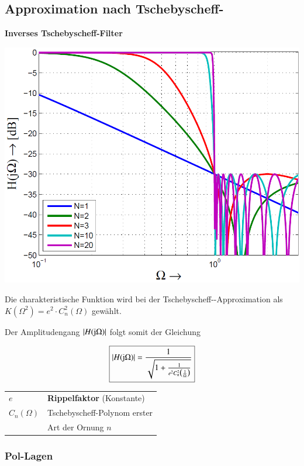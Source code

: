 \subsection{Approximation nach Tschebyscheff-}

\begin{minipage}[c]{0.45\columnwidth}
    \textbf{Inverses Tschebyscheff-Filter}

    \includegraphics[width=\columnwidth]{images/filter_tschebyscheff_invers_amplitudengang.png}
\end{minipage}
\hfill
\begin{minipage}[c]{0.48\columnwidth}
    Die charakteristische Funktion wird bei der Tschebyscheff--Approximation als\\
    $K(\Omega^2) = e^2 \cdot C_n^2(\Omega)$ gewählt.

    Der Amplitudengang $|H(\mathrm{j} \Omega)|$ folgt somit der Gleichung

    $$ \boxed{ |H(\mathrm{j} \Omega)| = \frac{1}{\sqrt{1 + \frac{1}{e^2 C_n^2  \big(\frac{1}{\Omega} \big) }}} } $$

    \begin{tabular}{ll@{}}
        $e$             & \textbf{Rippelfaktor} (Konstante) \\
        $C_n(\Omega)$   & Tschebyscheff-Polynom erster\\
                        & Art der Ornung $n$
    \end{tabular}
\end{minipage}

\subsubsection{Pol-Lagen}


